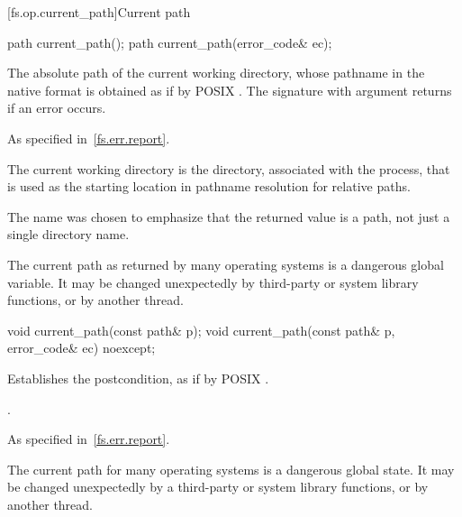 [fs.op.current_path]{Current path}

%
\begin{itemdecl}
path current_path();
path current_path(error_code& ec);
\end{itemdecl}

\begin{itemdescr}
\pnum
\returns The absolute path of the current working directory,
  whose pathname in the native format is
  obtained as if by POSIX .
  The signature with argument  returns  if an
  error occurs.

\pnum
\throws As specified in~\ref{fs.err.report}.

\pnum
\remarks The current working directory is the directory, associated
  with the process, that is used as the starting location in pathname resolution
  for relative paths.

\pnum
\begin{note} The  name was chosen to emphasize that the returned value is a
  path, not just a single directory name. \end{note}

\pnum
\begin{note} The current path as returned by many operating systems is a dangerous
  global variable. It may be changed unexpectedly by third-party or system
  library functions, or by another thread. \end{note}
\end{itemdescr}

%
\begin{itemdecl}
void current_path(const path& p);
void current_path(const path& p, error_code& ec) noexcept;
\end{itemdecl}

\begin{itemdescr}
\pnum
\effects Establishes the postcondition, as if by POSIX .

\pnum
\ensures {}.

\pnum
\throws As specified in~\ref{fs.err.report}.

\pnum
\begin{note} The current path for many operating systems is a dangerous
  global state. It may be changed unexpectedly by a third-party or system
  library functions, or by another thread. \end{note}
\end{itemdescr}

